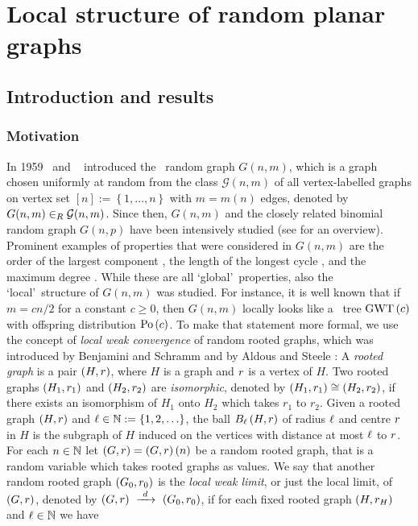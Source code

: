 
\chapter{Local structure of random planar graphs}\label{cha:local_structure}

\section{Introduction and results}\label{LSsec:intro}

\subsection{Motivation}\label{LSsub:motivation}
In 1959 \Erdos\ and \Renyi\ \cite{ErdoesRenyi1959} introduced the \ER\ random graph $G(n,m)$, which is a graph chosen uniformly at random from the class $\mathcal{G}(n,m)$ of all vertex-labelled graphs on vertex set $[n]:=\left\{1, \ldots, n\right\}$ with $m=m(n)$ edges, denoted by $G(n,m)\in_R\mathcal{G}(n,m)$. Since then, $G(n,m)$ and the closely related binomial random graph $G(n,p)$ have been intensively studied (see \cite{FriezeKaronski2016,JansonLuczakRucinski2000,Bollobas2001} for an overview). Prominent examples of properties that were considered in $G(n,m)$ are the order of the largest component \cite{ErdoesRenyi1960,Luczak1990,Bollobas1984}, the length of the longest cycle \cite{Luczak1991b,LuczakPittelWierman1994,AjtaiKomlosSzemeredi1981}, and the maximum degree \cite{Bollobas1982,Bollobas1980b,RiordanSelby2000}. While these are all \lq global\rq\ properties, also the \lq local\rq\ structure of $G(n,m)$ was studied. For instance, it is well known that if $m=cn/2$ for a constant $c\geq 0$, then $G(n,m)$ locally looks like a \GW\ tree $\operatorname{GWT}\left(c\right)$ with offspring distribution $\operatorname{Po}\left(c\right)$. To make that statement more formal, we use the concept of {\em local weak convergence} of random rooted graphs, which was introduced by Benjamini and Schramm \cite{BenjaminiSchramm2001} and by Aldous and Steele \cite{AldousSteele2004}: A {\em rooted graph} is a pair $\left(H, r\right)$, where $H$ is a graph and $r$ is a vertex of $H$. Two rooted graphs $\left(H_1, r_1\right)$ and $\left(H_2, r_2\right)$ are {\em isomorphic}, denoted by $\left(H_1, r_1\right)\cong\left(H_2, r_2\right)$, if there exists an isomorphism of $H_1$ onto $H_2$ which takes $r_1$ to $r_2$. Given a rooted graph $\left(H, r\right)$ and $\ell\in\mathbb{N}:=\left\{1, 2, \ldots\right\}$, the ball $B_{\ell}\left(H, r\right)$ of radius $\ell$ and centre $r$ in $H$ is the subgraph of $H$ induced on the vertices with distance at most $\ell$ to $r$. For each $n\in\mathbb{N}$ let $\left(G, r\right)=\left(G, r\right)(n)$ be a random rooted graph, that is a random variable which takes rooted graphs as values. We say that another random rooted graph $\left(G_0, r_0\right)$ is the {\em local weak limit}, or just the local limit, of $\left(G, r\right)$, denoted by $\left(G, r\right)~\xrightarrow{~d~}~\left(G_0, r_0\right)$, if for each fixed rooted graph $\left(H, r_H\right)$ and $\ell\in\mathbb{N}$ we have
